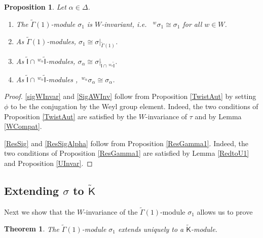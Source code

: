 \documentclass[10pt, letterpaper]{amsart}
\theoremstyle{plain}
\newtheorem{Thm}[equation]{Theorem}
\newtheorem{Prop}[equation]{Proposition}
\theoremstyle{definition}
\numberwithin{equation}{section}
\newcommand{\If}{\mathsf{I}}
\newcommand{\Kf}{\mathsf{K}}
\newcommand{\Gammaf}{\mathsf{\Gamma}}
\newcommand{\ie}{{\it i.e.}\ }
\begin{document}
\begin{Prop}\label{IRep} Let $\alpha\in\Delta$.
	\begin{enumerate}[(1)]
		\item The $\widetilde{{\Gammaf}}(1)$-module $\sigma_{1}$ is $W$-invariant, \ie
        $^w\sigma_1\cong\sigma_1$ for all $w\in W$.\label{sigWInvar}
		\item As $\widetilde{{\Gammaf}}(1)$-modules, $\sigma_{1}\cong\sigma|_{\widetilde{{\Gammaf}}(1)}$.\label{ResSig}
		\item As $\widetilde{{\If}}\cap\,^{w_{\alpha}}\widetilde{{\If}}$-modules, $\sigma_{\alpha}\cong\sigma|_{\widetilde{{\If}}\cap\,^{w_{\alpha}}\widetilde{{\If}}}$.\label{ResSigAlpha}
		\item As $\widetilde{{\If}}\cap\,^{w_{\alpha}}\widetilde{{\If}}$-modules , $\,^{w_{\alpha}}\sigma_{\alpha}\cong\sigma_{\alpha}$.\label{SigAWInv}
	\end{enumerate}
\end{Prop}

\begin{proof}	
	\eqref{sigWInvar} and \eqref{SigAWInv} follow from Proposition \ref{TwistAut} by setting $\phi$ to be the conjugation by the Weyl group element. Indeed, the two conditions of Proposition \ref{TwistAut} are satisfied by the $W$-invariance of $\tau$ and by Lemma \ref{WCompat}.
	
	\eqref{ResSig} and \eqref{ResSigAlpha} follow from Proposition \ref{ResGamma1}. Indeed, the two conditions of Proposition \ref{ResGamma1} are satisfied by Lemma \ref{RedtoU1} and Proposition \ref{UInvar}.
\end{proof}



\subsection{Extending $\sigma$ to $\widetilde{\Kf}$}\label{S:KType}

Next we show that the $W$-invariance of the $\widetilde{{\Gammaf}}(1)$-module $\sigma_{1}$ allows us to prove
\begin{Thm}\label{KRep}
	The $\widetilde{\Gammaf}(1)$-module $\sigma_{1}$ extends uniquely to a $\widetilde{{\Kf}}$-module.
\end{Thm}
\end{document}

